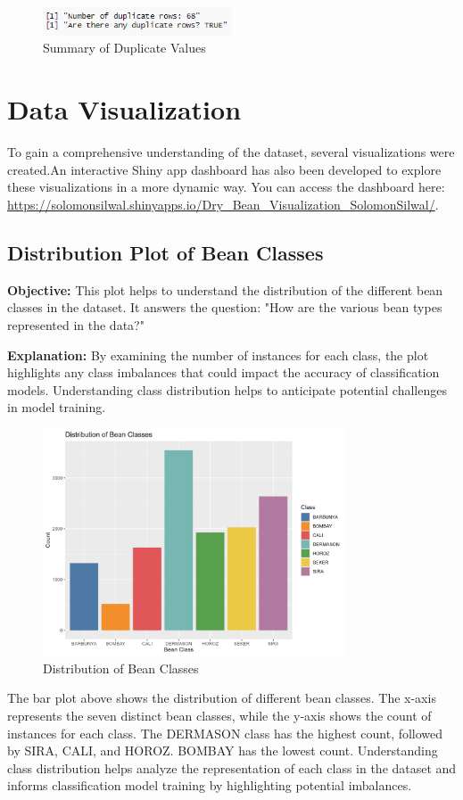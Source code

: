 \documentclass[a4paper,12pt]{article}
\begin{document}
\begin{figure}[H]
    \centering
    \includegraphics[width=0.5\textwidth]{graphs/duplicate.png}
    \caption{Summary of Duplicate Values}
    \label{fig:duplicate_values}
\end{figure}

\newpage

\section{Data Visualization}
To gain a comprehensive understanding of the dataset, several visualizations were created.An interactive Shiny app dashboard has also been developed to explore these visualizations in a more dynamic way. You can access the dashboard here: \url{https://solomonsilwal.shinyapps.io/Dry_Bean_Visualization_SolomonSilwal/}.


\subsection{Distribution Plot of Bean Classes}
\noindent\textbf{Objective:} This plot helps to understand the distribution of the different bean classes in the dataset. It answers the question: "How are the various bean types represented in the data?"

\noindent\textbf{Explanation:} By examining the number of instances for each class, the plot highlights any class imbalances that could impact the accuracy of classification models. Understanding class distribution helps to anticipate potential challenges in model training.
\begin{figure}[H]
    \centering
    \includegraphics[width=0.8\textwidth]{graphs/bean_class_distribution.png}
    \caption{Distribution of Bean Classes}
    \label{fig:distribution_classes}
\end{figure}
The bar plot above shows the distribution of different bean classes. The x-axis represents the seven distinct bean classes, while the y-axis shows the count of instances for each class. The DERMASON class has the highest count, followed by SIRA, CALI, and HOROZ. BOMBAY has the lowest count. Understanding class distribution helps analyze the representation of each class in the dataset and informs classification model training by highlighting potential imbalances.
\end{document}
